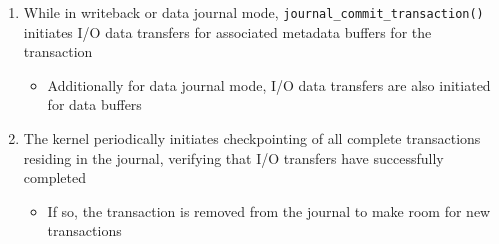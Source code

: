 \begin{enumerate}
	\item While in writeback or data journal mode, \texttt{journal_commit_transaction()} initiates I/O data transfers for associated metadata buffers for the transaction
		\begin{itemize}
		\item Additionally for data journal mode, I/O data transfers are also initiated for data buffers
		\end{itemize}
	\item The kernel periodically initiates checkpointing of all complete transactions residing in the journal, verifying that I/O transfers have successfully completed
		\begin{itemize}
		\item If so, the transaction is removed from the journal to make room for new transactions
		\end{itemize}
\end{enumerate}